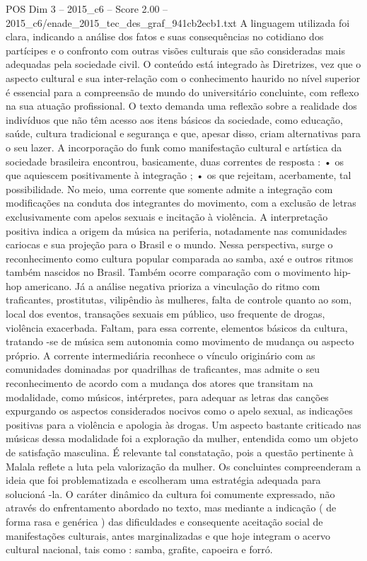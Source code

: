 \begin{textsample}{POS Dim 3 – 2015\_c6 – Score 2.00 – 2015\_c6/enade\_2015\_tec\_des\_graf\_941cb2ecb1.txt}
A linguagem utilizada foi clara, indicando a análise dos fatos e suas consequências no cotidiano dos partícipes e o confronto com outras visões culturais que são consideradas mais adequadas pela sociedade civil.
O conteúdo está integrado às Diretrizes, vez que o aspecto cultural e sua inter-relação com o conhecimento haurido no nível superior é essencial para a compreensão de mundo do universitário concluinte, com reflexo na sua atuação profissional.
O texto demanda uma reflexão sobre a realidade dos indivíduos que não têm acesso aos itens básicos da sociedade, como educação, saúde, cultura tradicional e segurança e que, apesar disso, criam alternativas para o seu lazer.
A incorporação do funk como manifestação cultural e artística da sociedade brasileira encontrou, basicamente, duas correntes de resposta : • os que aquiescem positivamente à integração ; • os que rejeitam, acerbamente, tal possibilidade.
No meio, uma corrente que somente admite a integração com modificações na conduta dos integrantes do movimento, com a exclusão de letras exclusivamente com apelos sexuais e incitação à violência.
A interpretação positiva indica a origem da música na periferia, notadamente nas comunidades cariocas e sua projeção para o Brasil e o mundo.
Nessa perspectiva, surge o reconhecimento como cultura popular comparada ao samba, axé e outros ritmos também nascidos no Brasil.
Também ocorre comparação com o movimento hip-hop americano.
Já a análise negativa prioriza a vinculação do ritmo com traficantes, prostitutas, vilipêndio às mulheres, falta de controle quanto ao som, local dos eventos, transações sexuais em público, uso frequente de drogas, violência exacerbada.
Faltam, para essa corrente, elementos básicos da cultura, tratando -se de música sem autonomia como movimento de mudança ou aspecto próprio.
A corrente intermediária reconhece o vínculo originário com as comunidades dominadas por quadrilhas de traficantes, mas admite o seu reconhecimento de acordo com a mudança dos atores que transitam na modalidade, como músicos, intérpretes, para adequar as letras das canções expurgando os aspectos considerados nocivos como o apelo sexual, as indicações positivas para a violência e apologia às drogas.
Um aspecto bastante criticado nas músicas dessa modalidade foi a exploração da mulher, entendida como um objeto de satisfação masculina.
É relevante tal constatação, pois a questão pertinente à Malala reflete a luta pela valorização da mulher.
Os concluintes compreenderam a ideia que foi problematizada e escolheram uma estratégia adequada para solucioná -la.
O caráter dinâmico da cultura foi comumente expressado, não através do enfrentamento abordado no texto, mas mediante a indicação ( de forma rasa e genérica ) das dificuldades e consequente aceitação social de manifestações culturais, antes marginalizadas e que hoje integram o acervo cultural nacional, tais como : samba, grafite, capoeira e forró.

\end{textsample}

